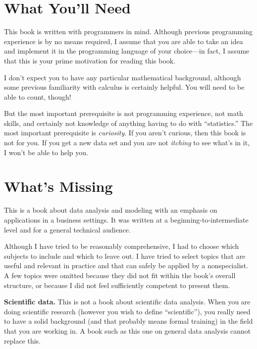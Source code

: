 
\section{What You'll Need}

This book is written with programmers in mind. Although previous
programming experience is by no means required, I assume that you are
able to take an idea and implement it in the programming language of
your choice---in fact, I assume that this is your prime motivation
for reading this book.

I don't expect you to have any particular mathematical background,
although some previous familiarity with calculus is certainly helpful.
You will need to be able to count, though!

But the most important prerequisite is not programming experience, not
math skills, and certainly not knowledge of anything having to do with
``statistics.''  The most important prerequisite is \emph{curiosity}.
If you aren't curious, then this book is not for you.  If you get a
new data set and you are not \emph{itching} to see what's in it, I
won't be able to help you.


\section{What's Missing}

This is a book about data analysis and modeling with an emphasis on
applications in a business settings. It was written at a
beginning-to-intermediate level and for a general technical audience.

Although I have tried to be reasonably comprehensive, I had to choose
which subjects to include and which to leave out. I have tried to
select topics that are useful and relevant in practice and that can
safely be applied by a nonspecialist. A few topics were omitted
because they did not fit within the book's overall structure, or
because I did not feel sufficiently competent to present them.

\textbf{Scientific data.} This is not a book about scientific data
analysis.  When you are doing scientific research (however you wish
to define ``sc{i}entif{i}c''), you really need to have a solid
background (and that probably means formal training) in the field
that you are working in. A book such as this one on general data
analysis cannot replace this. 

